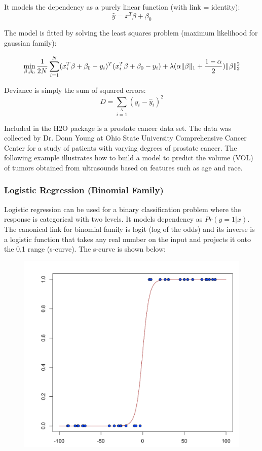 It models the dependency as a purely linear function (with link = identity):
\[ \hat{y} = x^T\beta + \beta_0\]

The model is fitted by solving the least squares problem (maximum likelihood for gaussian family):

\[ \min\limits_{\beta,\beta_0} { {1 \over 2N}\sum\limits_{i=1}\limits^{N}(x_i^{T}\beta  + \beta_0- y_i)^T (x_i^{T}\beta + \beta_0 - y_i)  + \lambda (\alpha \|\beta \|_1 + {1-\alpha \over 2}) \| \beta \|_2^2} \]

Deviance is simply the sum of squared errors:
\[ D = \sum\limits_{i=1}\limits^{N}{(y_i - \hat{y}_i)^2} \]

\waterExampleInR

Included in the H2O package is a prostate cancer data set. The data was collected by Dr. Donn Young at Ohio State
University Comprehensive Cancer Center for a study of patients with varying degrees of prostate cancer. The
following example illustrates how to build a model to predict the volume (VOL) of tumors obtained from ultrasounds
based on features such as age and race.



\subsubsection{Logistic Regression (Binomial Family)}
Logistic regression can be used for a binary classification problem where the response is categorical with two
levels. It models dependency as $Pr(y = 1|x)$. The canonical link for binomial family is logit (log of the odds)
and its inverse is a logistic function that takes any real number on the input and projects it onto the 0,1 range
(s-curve).  The s-curve is shown below:

\begin{figure}[h]
\centering
\includegraphics[scale=0.5]{images/scurve.png}
\end{figure}

